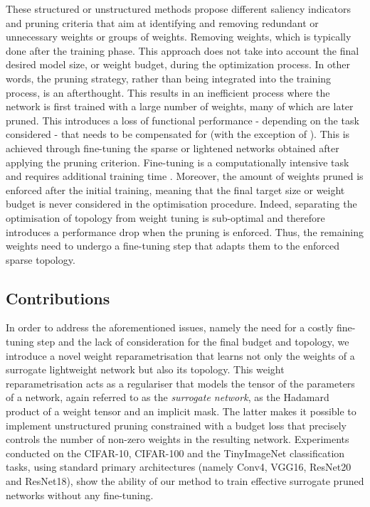 These structured or unstructured methods propose different saliency indicators
and pruning criteria that aim at identifying and removing redundant or
unnecessary weights or groups of weights. Removing weights, which is typically
done after the training phase. This approach does not take into account the
final desired model size, or weight budget, during the optimization process. In
other words, the pruning strategy, rather than being integrated into the
training process, is an afterthought. This results in an inefficient process
where the network is first trained with a large number of weights, many of which
are later pruned. This introduces a loss of functional performance - depending
on the task considered - that needs to be compensated for (with the exception of
\cite{DBLP:conf/icml/KangH20,DBLP:conf/nips/HassibiS92}). This is achieved
through fine-tuning the sparse or lightened networks obtained after applying the
pruning criterion. Fine-tuning is a computationally intensive task and requires
additional training time
\cite{DBLP:conf/nips/HanPTD15,DBLP:journals/corr/HanMD15}. Moreover, the amount
of weights pruned is enforced after the initial training, meaning that the final
target size or weight budget is never considered in the optimisation procedure.
Indeed, separating the optimisation of topology from weight tuning is
sub-optimal and therefore introduces a performance drop when the pruning is
enforced. Thus, the remaining weights need to undergo a fine-tuning step that
adapts them to the enforced sparse topology. \\

\subsection{Contributions}

In order to address the aforementioned issues, namely the need for a costly
fine-tuning step and the lack of consideration for the final budget and
topology, we introduce a novel weight reparametrisation that learns not only the
weights of a surrogate lightweight network but also its topology. This weight
reparametrisation acts as a regulariser that models the tensor of the parameters
of a network, again referred to as the \textit{surrogate network}, as the
Hadamard product of a weight tensor and an implicit mask. The latter makes it
possible to implement unstructured pruning constrained with a budget loss that
precisely controls the number of non-zero weights in the resulting network.
Experiments conducted on the CIFAR-10, CIFAR-100 and the TinyImageNet
classification tasks, using standard primary architectures (namely Conv4, VGG16,
ResNet20 and ResNet18), show the ability of our method to train effective
surrogate pruned networks without any fine-tuning.\\


